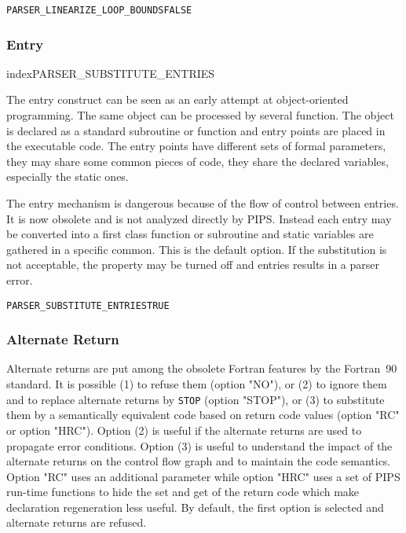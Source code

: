 \documentclass[a4paper]{report}
\newenvironment{PipsProp}{\begin{alltt}}{\end{alltt}}
\begin{document}
\begin{PipsProp}
PARSER_LINEARIZE_LOOP_BOUNDS FALSE
\end{PipsProp}

\subsubsection*{Entry}
index{PARSER\_SUBSTITUTE\_ENTRIES}

The entry construct can be seen as an early attempt at object-oriented
programming. The same object can be processed by several function. The
object is declared as a standard subroutine or function and entry points
are placed in the executable code. The entry points have different sets of
formal parameters, they may share some common pieces of code, they share
the declared variables, especially the static ones.

The entry mechanism is dangerous because of the flow of control between
entries. It is now obsolete and is not analyzed directly by PIPS. Instead
each entry may be converted into a first class function or subroutine and
static variables are gathered in a specific common. This is the default
option. If the substitution is not acceptable, the property may be turned
off and entries results in a parser error.

\begin{PipsProp}
PARSER_SUBSTITUTE_ENTRIES TRUE
\end{PipsProp}

\subsubsection*{Alternate Return}

Alternate returns are put among the obsolete Fortran features by the
Fortran~90 standard. It is possible (1) to refuse them (option "NO"), or
(2) to ignore them and to replace alternate returns by {\tt STOP} (option
"STOP"), or (3) to substitute them by a semantically equivalent code based
on return code values (option "RC" or option "HRC"). Option (2) is useful
if the alternate returns are used to propagate error conditions. Option
(3) is useful to understand the impact of the alternate returns on the
control flow graph and to maintain the code semantics.  Option "RC" uses
an additional parameter while option "HRC" uses a set of PIPS run-time
functions to hide the set and get of the return code which make
declaration regeneration less useful. By default, the
first option is selected and alternate returns are refused.
\end{document}
